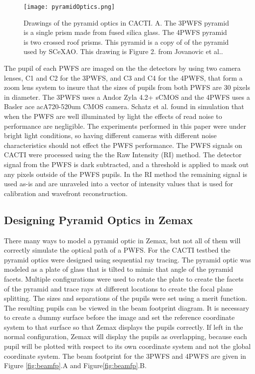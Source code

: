 \begin{figure}
    \centering
    \texttt{[image: pyramidOptics.png]}
    \caption{Drawings of the pyramid optics in CACTI. A. The 3PWFS pyramid is a single prism made from fused silica glass. The 4PWFS pyramid is two crossed roof prisms. This pyramid is a copy of of the pyramid used by SCeXAO. This drawing is Figure 2. from Jovanovic et al.\cite{jovanovic2016scexao}. }
    \label{fig:pyramidOptics}
\end{figure}


The pupil of each PWFS are imaged on the the detectors by using two camera lenses, C1 and C2 for the 3PWFS, and C3 and C4 for the 4PWFS,  that form a zoom lens system to insure that the sizes of pupils from both PWFS are 30 pixels in diameter. The 3PWFS uses a Andor Zyla 4.2+ sCMOS and the 4PWFS uses a Basler ace acA720-520um CMOS camera. Schatz et al. found in simulation that when the PWFS are well illuminated by light the effects of read noise to performance are negligible. The experiments performed in this paper were under bright light conditions, so having different cameras with different noise characteristics should not effect the PWFS performance. The PWFS signals on CACTI were processed using the the Raw Intensity (RI) method. The detector signal from the PWFS is dark subtracted, and a threshold is applied to mask out any pixels outside of the PWFS pupils. In the RI method the remaining signal is used as-is and are unraveled into a vector of intensity values that is used for calibration and wavefront reconstruction.


\subsection{Designing Pyramid Optics in Zemax}

There many ways to model a pyramid optic in Zemax, but not all of them will correctly simulate the optical path of a PWFS. For the CACTI testbed the pyramid optics were designed using sequential ray tracing. The pyramid optic was modeled as a plate of glass that is tilted to mimic that angle of the pyramid facets. Multiple configurations were used to rotate the plate to create the facets of the pyramid and trace rays at different locations to create the focal plane splitting. The sizes and separations of the pupils were set using a merit function. The resulting pupils can be viewed in the beam footprint diagram. It is necessary to create a dummy surface before the image and set the reference coordinate system to that surface so that Zemax displays the pupils correctly. If left in the normal configuration, Zemax will display the pupils as overlapping, because each pupil will be plotted with respect to its own coordinate system and not the global coordinate system. The beam footprint for the 3PWFS and 4PWFS are given in Figure \ref{fig:beamfp}.A and Figure\ref{fig:beamfp}.B. 


